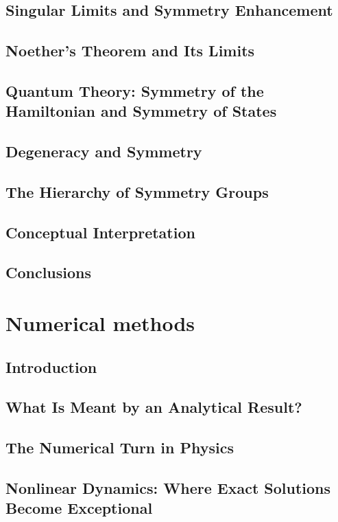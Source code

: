 \section{Singular Limits and Symmetry Enhancement}
\label{sp:sl}
\section{Noether's Theorem and Its Limits}
\label{sp:nt}
\section{Quantum Theory: Symmetry of the Hamiltonian and Symmetry of States}
\label{sp:qt}
\section{ Degeneracy and Symmetry}
\label{sp:ds}
\section{ The Hierarchy of Symmetry Groups}
\label{sp:hs}
\section{Conceptual Interpretation}
\label{sp:ci}
\section{ Conclusions}
\label{sp:co}

\chapter{Numerical methods}
\label{nm}
\section{ Introduction}
\label{nm:in}
\section{ What Is Meant by an Analytical Result?}
\label{nm:an}
\section{ The Numerical Turn in Physics}
\label{nm:tp}
\section{ Nonlinear Dynamics: Where Exact Solutions Become Exceptional}
\label{nm:nd}
